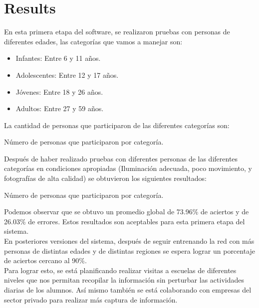 
\section{Results}

En esta primera etapa del software, se realizaron pruebas con personas de
diferentes edades, las categorías que vamos a manejar son:
\begin{itemize}
	\item Infantes: Entre 6 y 11 años.
	\item Adolescentes: Entre 12 y 17 años.
	\item Jóvenes: Entre 18 y 26 años.
	\item Adultos: Entre 27 y 59 años.
\end{itemize}
La cantidad de personas que participaron de las diferentes categorías son:
\begin{table}[h!]
	\centering
	\caption{Número de personas que participaron por categoría. {\label{tab:stats_category_num}}}
	
\end{table}

Después de haber realizado pruebas con diferentes personas de las diferentes
categorías en condiciones apropiadas (Iluminación adecuada, poco movimiento, y
fotografías de alta calidad) se obtuvieron los siguientes resultados:

\begin{table}[h!]
	\centering
	\caption{Número de personas que participaron por categoría. {\label{tab:stats_facial_recognition_results}}}
	
\end{table}

Podemos observar que se obtuvo un promedio global de 73.96\% de aciertos y de
26.03\% de errores. Estos resultados son aceptables para esta primera etapa del
sistema. \\En posteriores versiones del sistema, después de seguir entrenando
la red con más personas de distintas edades y de distintas regiones se espera
lograr un porcentaje de aciertos cercano al 90\%. \\Para lograr esto, se está
planificando realizar visitas a escuelas de diferentes niveles que nos permitan
recopilar la información sin perturbar las actividades diarias de los alumnos.
Así mismo también se está colaborando con empresas del sector privado para
realizar más captura de información.